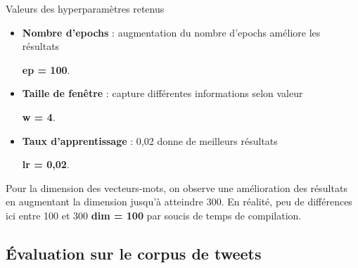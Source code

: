 \documentclass[10pt,xcolor=table,color={dvipsnames,usenames},ignorenonframetext,usepdftitle=false,french]{beamer}
\begin{document}
\begin{frame}{Valeurs des hyperparamètres retenus}

\begin{itemize}

\item \textbf{Nombre d'epochs} : augmentation du nombre d'epochs améliore les résultats

\faArrowCircleRight{} \textbf{ep = 100}.

\item \textbf{Taille de fenêtre} : capture différentes informations selon valeur

\faArrowCircleRight{} \textbf{w = 4}.

\item \textbf{Taux d'apprentissage} : 0,02 donne de meilleurs résultats

\faArrowCircleRight{} \textbf{lr = 0,02}.
\end{itemize}

Pour la dimension des vecteurs-mots, on observe une amélioration des
résultats en augmentant la dimension jusqu'à atteindre 300. En réalité,
peu de différences ici entre 100 et 300 \faArrowCircleRight{}
\textbf{dim = 100} par soucis de temps de compilation.

\end{frame}

\subsection{Évaluation sur le corpus de
tweets}\label{uxe9valuation-sur-le-corpus-de-tweets}
\end{document}
